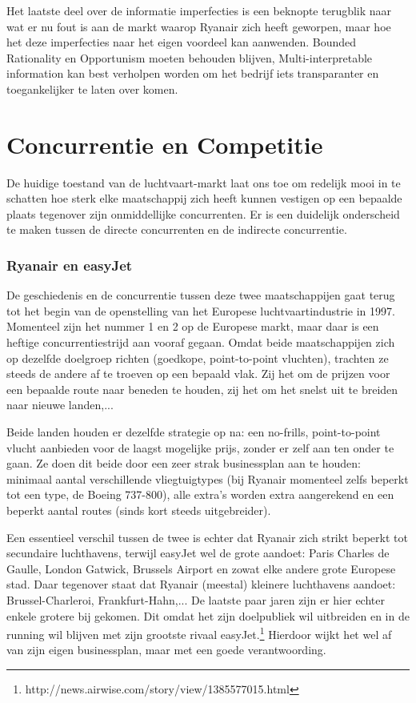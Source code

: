 \documentclass{article}
\begin{document}
Het laatste deel over de informatie imperfecties is een beknopte terugblik naar wat er nu fout is aan de markt waarop Ryanair zich heeft geworpen, maar hoe het deze imperfecties naar het eigen voordeel kan aanwenden. Bounded Rationality en Opportunism moeten behouden blijven, Multi-interpretable information kan best verholpen worden om het bedrijf iets transparanter en toegankelijker te laten over komen.

\newpage
\part{Concurrentie en Competitie}

De huidige toestand van de luchtvaart-markt laat ons toe om redelijk mooi in te schatten hoe sterk elke maatschappij zich heeft kunnen vestigen op een bepaalde plaats tegenover zijn onmiddellijke concurrenten.
Er is een duidelijk onderscheid te maken tussen de directe concurrenten en de indirecte concurrentie.

\section{Ryanair en easyJet}

De geschiedenis en de concurrentie tussen deze twee maatschappijen gaat terug tot het begin van de openstelling van het Europese luchtvaartindustrie in 1997. Momenteel zijn het nummer 1 en 2 op de Europese markt, maar daar is een heftige concurrentiestrijd aan vooraf gegaan. Omdat beide maatschappijen zich op dezelfde doelgroep richten (goedkope, point-to-point vluchten), trachten ze steeds de andere af te troeven op een bepaald vlak. Zij het om de prijzen voor een bepaalde route naar beneden te houden, zij het om het snelst uit te breiden naar nieuwe landen,...

Beide landen houden er dezelfde strategie op na: een no-frills, point-to-point vlucht aanbieden voor de laagst mogelijke prijs, zonder er zelf aan ten onder te gaan. Ze doen dit beide door een zeer strak businessplan aan te houden: minimaal aantal verschillende vliegtuigtypes (bij Ryanair momenteel zelfs beperkt tot een type, de Boeing 737-800), alle extra's worden extra aangerekend en een beperkt aantal routes (sinds kort steeds uitgebreider).

Een essentieel verschil tussen de twee is echter dat Ryanair zich strikt beperkt tot secundaire luchthavens, terwijl easyJet wel de grote aandoet: Paris Charles de Gaulle, London Gatwick, Brussels Airport en zowat elke andere grote Europese stad. Daar tegenover staat dat Ryanair (meestal) kleinere luchthavens aandoet: Brussel-Charleroi, Frankfurt-Hahn,... De laatste paar jaren zijn er hier echter enkele grotere bij gekomen. Dit omdat het zijn doelpubliek wil uitbreiden en in de running wil blijven met zijn grootste rivaal easyJet.\footnote{http://news.airwise.com/story/view/1385577015.html} Hierdoor wijkt het wel af van zijn eigen businessplan, maar met een goede verantwoording.
\end{document}
